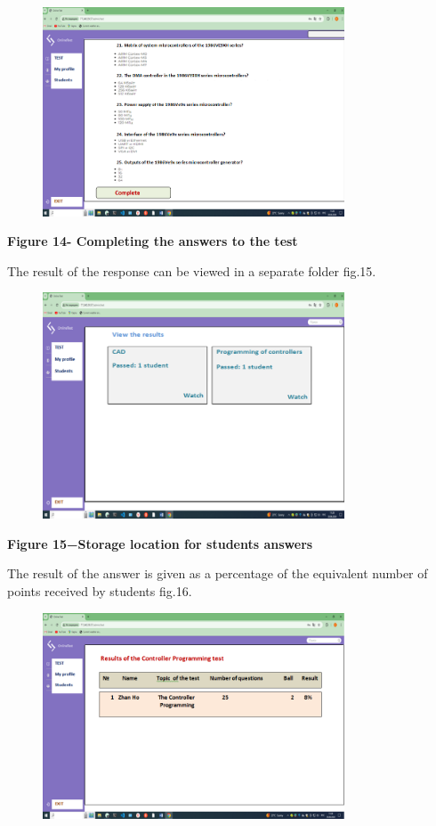 \begin{figure}[H]
	\centering
	\includegraphics[width=0.8\textwidth]{assets/139}
	\caption*{}
\end{figure}

{\bfseries Figure 14- Completing the answers to the test}

The result of the response can be viewed in a separate folder fig.15.

\begin{figure}[H]
	\centering
	\includegraphics[width=0.8\textwidth]{assets/140}
	\caption*{}
\end{figure}

{\bfseries Figure 15−Storage location for students\textquotesingle{}
answers}

The result of the answer is given as a percentage of the equivalent
number of points received by students fig.16.

\begin{figure}[H]
	\centering
	\includegraphics[width=0.8\textwidth]{assets/141}
	\caption*{}
\end{figure}

